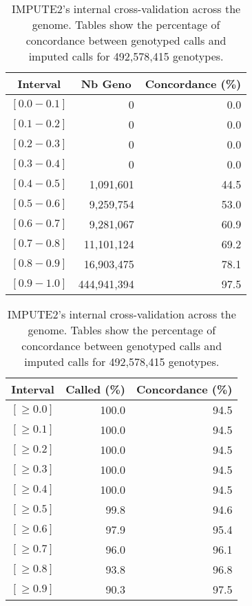\documentclass[10pt,twoside,english]{scrartcl}
\begin{document}
\begin{table}[H]
\protect\caption{IMPUTE2's internal cross-validation across the genome. Tables show the
percentage of concordance between genotyped calls and imputed calls
for 492,578,415 genotypes.\label{tab:cross_validation}}

\centering

\begin{tabular}{crr}
\hline 
\multicolumn{1}{c}{\textbf{Interval}}
 & \multicolumn{1}{c}{\textbf{Nb Geno}}
 & \multicolumn{1}{c}{\textbf{Concordance (\%)}}
\\
\hline 

$[0.0-0.1]$ & 0 & 0.0\\
$[0.1-0.2]$ & 0 & 0.0\\
$[0.2-0.3]$ & 0 & 0.0\\
$[0.3-0.4]$ & 0 & 0.0\\
$[0.4-0.5]$ & 1,091,601 & 44.5\\
$[0.5-0.6]$ & 9,259,754 & 53.0\\
$[0.6-0.7]$ & 9,281,067 & 60.9\\
$[0.7-0.8]$ & 11,101,124 & 69.2\\
$[0.8-0.9]$ & 16,903,475 & 78.1\\
$[0.9-1.0]$ & 444,941,394 & 97.5\\
\hline 
\end{tabular}
\hfill
\begin{tabular}{crr}
\hline 
\multicolumn{1}{c}{\textbf{Interval}}
 & \multicolumn{1}{c}{\textbf{Called (\%)}}
 & \multicolumn{1}{c}{\textbf{Concordance (\%)}}
\\
\hline 

$[\geq 0.0]$ & 100.0 & 94.5\\
$[\geq 0.1]$ & 100.0 & 94.5\\
$[\geq 0.2]$ & 100.0 & 94.5\\
$[\geq 0.3]$ & 100.0 & 94.5\\
$[\geq 0.4]$ & 100.0 & 94.5\\
$[\geq 0.5]$ & 99.8 & 94.6\\
$[\geq 0.6]$ & 97.9 & 95.4\\
$[\geq 0.7]$ & 96.0 & 96.1\\
$[\geq 0.8]$ & 93.8 & 96.8\\
$[\geq 0.9]$ & 90.3 & 97.5\\
\hline 
\end{tabular}


\end{table}
\end{document}
